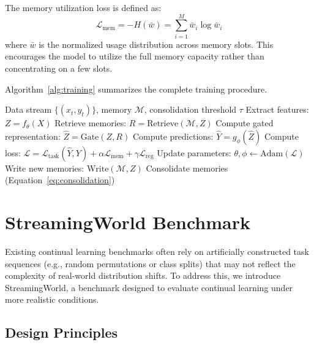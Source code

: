 \documentclass[11pt]{article}
\begin{document}
The memory utilization loss is defined as:
\begin{equation}
    \mathcal{L}_{\text{mem}} = -H(\bar{w}) = \sum_{i=1}^{M} \bar{w}_i \log \bar{w}_i
\end{equation}
where $\bar{w}$ is the normalized usage distribution across memory slots. This encourages the model to utilize the full memory capacity rather than concentrating on a few slots.

Algorithm~\ref{alg:training} summarizes the complete training procedure.

\begin{algorithm}
\caption{AMN Training Procedure}
\label{alg:training}
\begin{algorithmic}[1]
\REQUIRE Data stream $\{(x_t, y_t)\}$, memory $\mathcal{M}$, consolidation threshold $\tau$
    \STATE Extract features: $Z = f_\theta(X)$
    \STATE Retrieve memories: $R = \text{Retrieve}(\mathcal{M}, Z)$
    \STATE Compute gated representation: $\hat{Z} = \text{Gate}(Z, R)$
    \STATE Compute predictions: $\hat{Y} = g_\phi(\hat{Z})$
    \STATE Compute loss: $\mathcal{L} = \mathcal{L}_{\text{task}}(\hat{Y}, Y) + \alpha \mathcal{L}_{\text{mem}} + \gamma \mathcal{L}_{\text{reg}}$
    \STATE Update parameters: $\theta, \phi \leftarrow \text{Adam}(\mathcal{L})$
    \STATE Write new memories: $\text{Write}(\mathcal{M}, Z)$
        \STATE Consolidate memories (Equation~\ref{eq:consolidation})
    \ENDIF
\ENDFOR
\end{algorithmic}
\end{algorithm}

\section{StreamingWorld Benchmark}
\label{sec:benchmark}

Existing continual learning benchmarks often rely on artificially constructed task sequences (e.g., random permutations or class splits) that may not reflect the complexity of real-world distribution shifts. To address this, we introduce StreamingWorld, a benchmark designed to evaluate continual learning under more realistic conditions.

\subsection{Design Principles}
\end{document}

